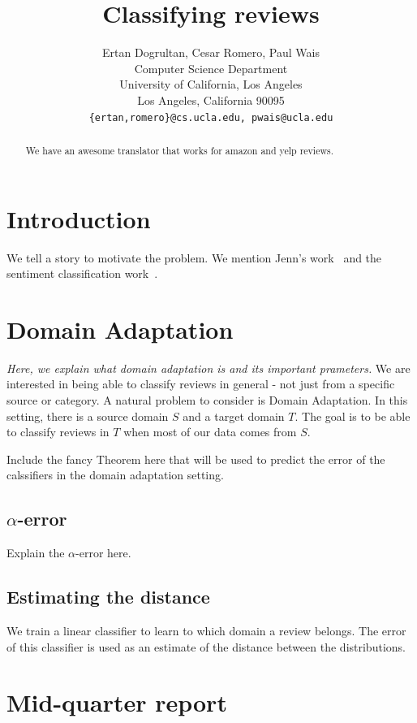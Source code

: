 \documentclass[letterpaper]{article}
\title{Classifying reviews}
\author{Ertan Dogrultan, Cesar Romero, Paul Wais\\
Computer Science Department \\
University of California, Los Angeles\\
Los Angeles, California 90095\\
\texttt{\{ertan,romero\}@cs.ucla.edu, pwais@ucla.edu}}
\begin{document}
\maketitle
\begin{abstract}
  We have an awesome translator that works for amazon and yelp reviews.
\end{abstract}

\section{Introduction}
\label{sec:introduction}

We tell a story to motivate the problem. We mention Jenn's
work~\cite{JennLearnDiffDomains} and the sentiment classification
work~\cite{PangSentimentClassification}.

\section{Domain Adaptation}
\label{sec:background}

\emph{Here, we explain what domain adaptation is and its important
prameters.}
We are interested in being able to classify reviews in general - not
just from a specific source or category. A natural problem to consider
is Domain Adaptation. In this setting, there is a source domain $S$
and a target domain $T$. The goal is to be able to classify reviews in
$T$ when most of our data comes from $S$. 

Include the fancy Theorem here that will be used to predict the error
of the calssifiers in the domain adaptation setting.

\subsection{$\alpha$-error}
\label{sec:alpha-error}

Explain the $\alpha$-error here.

\subsection{Estimating the distance}
\label{sec:estimating-distance}

We train a linear classifier to learn to which domain a review
belongs. The error of this classifier is used as an estimate of the
distance between the distributions.

\section{Mid-quarter report}
\label{sec:mid-quarter-report}
\end{document}
